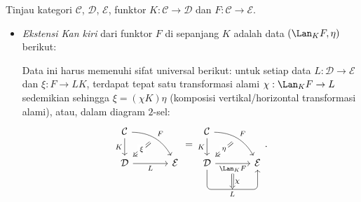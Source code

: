 \begin{definisi}[D.\ Kan]\label{def:Kan-extension}
	Tinjau kategori $\mathcal{C}$, $\mathcal{D}$, $\mathcal{E}$, funktor
	$K: \mathcal{C} \to \mathcal{D}$ dan $F: \mathcal{C} \to \mathcal{E}$.
	\begin{itemize}
		\item \emph{Ekstensi Kan kiri} dari funktor $F$ di sepanjang $K$ adalah
		data $(\Lan_K F, \eta)$ berikut:
		Data ini harus memenuhi sifat universal berikut: untuk setiap data
		$L: \mathcal{D} \to \mathcal{E}$ dan $\xi: F \to LK$, terdapat tepat
		satu transformasi alami $\chi: \Lan_K F \to L$ sedemikian sehingga
		$\xi = (\chi K) \eta$ (komposisi vertikal/horizontal transformasi alami),
		atau, dalam diagram $2$-sel:
		\[\begin{tikzcd}[column sep=large]
			\mathcal{C} \arrow[d, "K"'] \arrow[rd, bend left, "F", ""' {name=F}] & \\
			\mathcal{D} \arrow[r, "L"'] \arrow[Rightarrow, from=F, "\xi" description] & \mathcal{E}
		\end{tikzcd} = \begin{tikzcd}[column sep=large]
			\mathcal{C} \arrow[d, "K"'] \arrow[rd, bend left, "F", ""' {name=F}] & \\
			\mathcal{D} \arrow[r, "{\Lan_K F}"' name=A] \arrow[Rightarrow, from=F, "\eta" description] \arrow[r, "L"{below, name=B}, rounded corners, to path={-- ([yshift=-2em]\tikztostart.south) -- ([yshift=-2em] \tikztotarget.south) [midway]\tikztonodes -- (\tikztotarget) }] & \mathcal{E} \arrow[Rightarrow, from=A, to=B, "\chi"]
		\end{tikzcd}. \]


\end{itemize}
\end{definisi}

